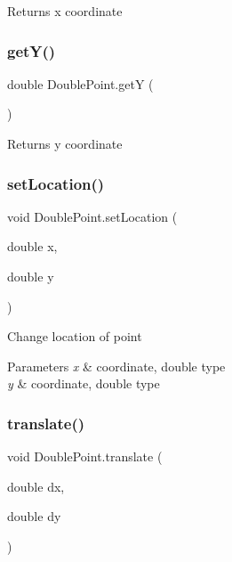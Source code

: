 \begin{DoxyReturn}{Returns}
x coordinate 
\end{DoxyReturn}
\mbox{\label{class_double_point_a23bfa07d4c1af558eb85ec06155e2740}} 
\subsubsection{\texorpdfstring{get\+Y()}{getY()}}
{\footnotesize\ttfamily double Double\+Point.\+getY (\begin{DoxyParamCaption}{ }\end{DoxyParamCaption})}

\begin{DoxyReturn}{Returns}
y coordinate 
\end{DoxyReturn}
\mbox{\label{class_double_point_abf7ded4d23fddd292e089f02dae94566}} 
\subsubsection{\texorpdfstring{set\+Location()}{setLocation()}}
{\footnotesize\ttfamily void Double\+Point.\+set\+Location (\begin{DoxyParamCaption}\item[{double}]{x,  }\item[{double}]{y }\end{DoxyParamCaption})}

Change location of point 
\begin{DoxyParams}{Parameters}
{\em x} & coordinate, double type \\
\hline
{\em y} & coordinate, double type \\
\hline
\end{DoxyParams}
\mbox{\label{class_double_point_a3f02b79ca4952156c087404cf85aee7d}} 
\subsubsection{\texorpdfstring{translate()}{translate()}}
{\footnotesize\ttfamily void Double\+Point.\+translate (\begin{DoxyParamCaption}\item[{double}]{dx,  }\item[{double}]{dy }\end{DoxyParamCaption})}

